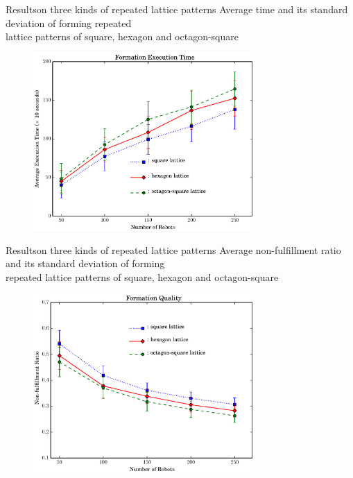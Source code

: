 \documentclass[10pt]{beamer}
\begin{document}
\begin{frame}{Results}{on three kinds of repeated
lattice patterns}
\textcolor{scred}{Average time and its standard deviation
            of forming repeated \\ 
            lattice patterns of square, hexagon
            and octagon-square}
          \begin{figure}
            \centering
            \includegraphics[width=0.75\textwidth]{figs/exptime}
          \end{figure}

\end{frame}
\begin{frame}{Results}{on three kinds of repeated
lattice patterns}
\textcolor{scred}{Average non-fulfillment ratio and its standard
            deviation of forming\\ repeated
            lattice patterns of square, hexagon
            and octagon-square}
          \begin{figure}
            \centering
            \includegraphics[width=0.75\textwidth]{figs/expqual}
          \end{figure}
\end{frame}
\end{document}
